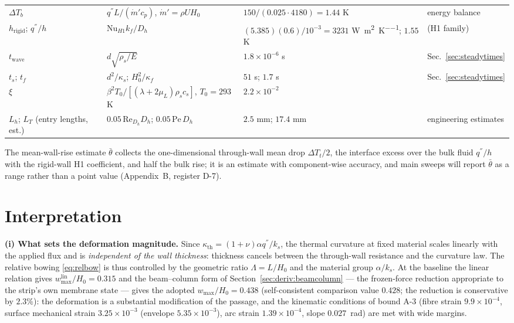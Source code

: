 \begin{longtable}{p{3.0cm}p{3.4cm}p{4.2cm}p{2.6cm}}
$\Delta T_b$ & $q^{''}L/(\dot m'c_p)$, $\dot m'=\rho UH_0$ & $150/(0.025\cdot4180)=1.44$ K & energy balance \\
$h_{\mathrm{rigid}}$; $q^{''}/h$ & $\mathrm{Nu}_{H1}k_f/D_h$ & $(5.385)(0.6)/10^{-3}=3231$ \si{\watt\per\square\metre\per\kelvin}; $1.55$ K & \cite{shah1978laminar} (H1 family) \\
$t_{\mathrm{wave}}$ & $d\sqrt{\rho_s/E}$ & $1.8\times10^{-6}$ s & Sec.~\ref{sec:steadytimes} \\
$t_s$; $t_f$ & $d^2/\kappa_s$; $H_0^2/\kappa_f$ & $51$ s; $1.7$ s & Sec.~\ref{sec:steadytimes} \\
$\xi$ & $\beta^2T_0/[(\lambda{+}2\mu_L)\rho_sc_s]$, $T_0=293$ K & $2.2\times10^{-2}$ & \cite{boley1960theory} \\
$L_h$; $L_T$ (entry lengths, est.) & $0.05\,\mathrm{Re}_{D_h}D_h$; $0.05\,\mathrm{Pe}\,D_h$ & $2.5$ mm; $17.4$ mm & engineering estimates \\
\bottomrule
\end{longtable}

The mean-wall-rise estimate $\bar\theta$ collects the one-dimensional through-wall mean drop
$\Delta T_t/2$, the interface excess over the bulk fluid $q^{''}/h$ with the rigid-wall H1
coefficient, and half the bulk rise; it is an estimate with component-wise accuracy, and main
sweeps will report $\bar\theta$ as a range rather than a point value (Appendix~B, register D-7).

\section{Interpretation}
\label{sec:interpretation}
\textbf{(i) What sets the deformation magnitude.} Since $\kappa_{\mathrm{th}}=(1+\nu)\alpha
q^{''}/k_s$, the thermal curvature at fixed material scales linearly with the applied flux and is
\emph{independent of the wall thickness}: thickness cancels between the through-wall resistance and
the curvature law. The relative bowing \eqref{eq:relbow} is thus controlled by the geometric ratio
$\Lambda=L/H_0$ and the material group $\alpha/k_s$. At the baseline the linear relation gives
$w_{\max}^{\mathrm{lin}}/H_0=0.315$ and the beam--column form of
Section~\ref{sec:deriv:beamcolumn} --- the frozen-force reduction appropriate to the strip's own
membrane state --- gives the adopted $w_{\max}/H_0=0.438$ (self-consistent comparison value
$0.428$; the reduction is conservative by $2.3\%$): the deformation is a substantial
modification of the passage, and the kinematic conditions of bound A-3 (fibre strain
$9.9\times10^{-4}$, surface mechanical strain $3.25\times10^{-3}$ (envelope $5.35\times10^{-3}$), arc strain
$1.39\times10^{-4}$, slope $0.027$~rad) are met with wide margins.

